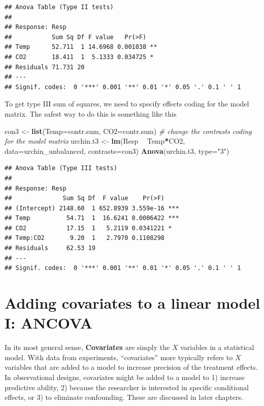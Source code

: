 \documentclass[]{book}
\newenvironment{Shaded}{\begin{snugshade}}{\end{snugshade}}
\newcommand{\KeywordTok}[1]{\textcolor[rgb]{0.13,0.29,0.53}{\textbf{#1}}}
\newcommand{\DataTypeTok}[1]{\textcolor[rgb]{0.13,0.29,0.53}{#1}}
\newcommand{\StringTok}[1]{\textcolor[rgb]{0.31,0.60,0.02}{#1}}
\newcommand{\CommentTok}[1]{\textcolor[rgb]{0.56,0.35,0.01}{\textit{#1}}}
\newcommand{\OperatorTok}[1]{\textcolor[rgb]{0.81,0.36,0.00}{\textbf{#1}}}
\newcommand{\NormalTok}[1]{#1}
\begin{document}
\begin{verbatim}
## Anova Table (Type II tests)
## 
## Response: Resp
##           Sum Sq Df F value   Pr(>F)   
## Temp      52.711  1 14.6968 0.001038 **
## CO2       18.411  1  5.1333 0.034725 * 
## Residuals 71.731 20                    
## ---
## Signif. codes:  0 '***' 0.001 '**' 0.01 '*' 0.05 '.' 0.1 ' ' 1
\end{verbatim}

To get type III sum of squares, we need to specify effects coding for
the model matrix. The safest way to do this is something like this

\begin{Shaded}
\begin{Highlighting}[]
\NormalTok{con3 <-}\StringTok{ }\KeywordTok{list}\NormalTok{(}\DataTypeTok{Temp=}\NormalTok{contr.sum, }\DataTypeTok{CO2=}\NormalTok{contr.sum) }\CommentTok{# change the contrasts coding for the model matrix}
\NormalTok{urchin.t3 <-}\StringTok{ }\KeywordTok{lm}\NormalTok{(Resp }\OperatorTok{~}\StringTok{ }\NormalTok{Temp}\OperatorTok{*}\NormalTok{CO2, }\DataTypeTok{data=}\NormalTok{urchin_unbalanced, }\DataTypeTok{contrasts=}\NormalTok{con3)}
\KeywordTok{Anova}\NormalTok{(urchin.t3, }\DataTypeTok{type=}\StringTok{"3"}\NormalTok{)}
\end{Highlighting}
\end{Shaded}

\begin{verbatim}
## Anova Table (Type III tests)
## 
## Response: Resp
##              Sum Sq Df  F value    Pr(>F)    
## (Intercept) 2148.60  1 652.8939 3.559e-16 ***
## Temp          54.71  1  16.6241 0.0006422 ***
## CO2           17.15  1   5.2119 0.0341221 *  
## Temp:CO2       9.20  1   2.7970 0.1108298    
## Residuals     62.53 19                       
## ---
## Signif. codes:  0 '***' 0.001 '**' 0.01 '*' 0.05 '.' 0.1 ' ' 1
\end{verbatim}

\chapter{Adding covariates to a linear model I:
ANCOVA}\label{adding-covariates-to-a-linear-model-i-ancova}

In its most general sense, \textbf{Covariates} are simply the \(X\)
variables in a statistical model. With data from experiments,
``covariates'' more typically refers to \(X\) variables that are added
to a model to increase precision of the treatment effects. In
observational designs, covariates might be added to a model to 1)
increase predictive ability, 2) because the researcher is interested in
specific conditional effects, or 3) to eliminate confounding. These are
discussed in later chapters.
\end{document}
